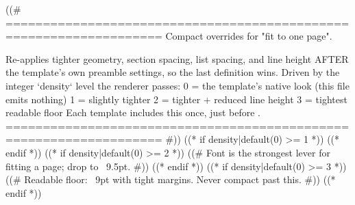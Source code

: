 ((# ===================================================================
    Compact overrides for "fit to one page".

    Re-applies tighter geometry, section spacing, list spacing, and line
    height AFTER the template's own preamble settings, so the last definition
    wins. Driven by the integer `density` level the renderer passes:
      0 = the template's native look (this file emits nothing)
      1 = slightly tighter
      2 = tighter + reduced line height
      3 = tightest readable floor
    Each template includes this once, just before .
   =================================================================== #))
((* if density|default(0) >= 1 *))
\geometry{top=0.45in, bottom=0.45in, left=0.5in, right=0.5in}
\titlespacing*{\section}{0pt}{6pt}{3pt}
\linespread{0.99}
((* endif *))
((* if density|default(0) >= 2 *))
\geometry{top=0.4in, bottom=0.4in, left=0.45in, right=0.45in}
\titlespacing*{\section}{0pt}{4pt}{2pt}
\linespread{0.97}
((# Font is the strongest lever for fitting a page; drop to ~9.5pt. #))
\AtBeginDocument{\fontsize{9.5pt}{11.2pt}\selectfont}
((* endif *))
((* if density|default(0) >= 3 *))
\geometry{top=0.35in, bottom=0.35in, left=0.4in, right=0.4in}
\titlespacing*{\section}{0pt}{3pt}{1.5pt}
\linespread{0.95}
((# Readable floor: ~9pt with tight margins. Never compact past this. #))
\AtBeginDocument{\fontsize{9pt}{10.6pt}\selectfont}
((* endif *))
